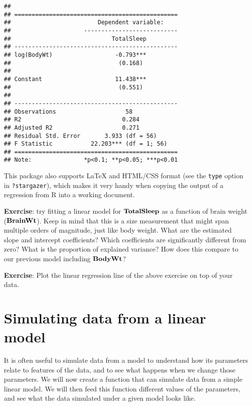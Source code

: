 \documentclass[
]{book}
\begin{document}
\begin{verbatim}
## 
## ===============================================
##                         Dependent variable:    
##                     ---------------------------
##                             TotalSleep         
## -----------------------------------------------
## log(BodyWt)                  -0.793***         
##                               (0.168)          
##                                                
## Constant                     11.438***         
##                               (0.551)          
##                                                
## -----------------------------------------------
## Observations                    58             
## R2                             0.284           
## Adjusted R2                    0.271           
## Residual Std. Error       3.933 (df = 56)      
## F Statistic           22.203*** (df = 1; 56)   
## ===============================================
## Note:               *p<0.1; **p<0.05; ***p<0.01
\end{verbatim}

This package also supports LaTeX and HTML/CSS format (see the \texttt{type} option in \texttt{?stargazer}), which makes it very handy when copying the output of a regression from R into a working document.

\textbf{Exercise}: try fitting a linear model for \(\bf{TotalSleep}\) as a function of brain weight (\(\bf{BrainWt}\)). Keep in mind that this is a size measurement that might span multiple orders of magnitude, just like body weight. What are the estimated slope and intercept coefficients? Which coefficients are significantly different from zero? What is the proportion of explained variance? How does this compare to our previous model including \(\bf{BodyWt}\)?

\textbf{Exercise}: Plot the linear regression line of the above exercise on top of your data.

\hypertarget{simulating-data-from-a-linear-model-1}{%
\section{Simulating data from a linear model}\label{simulating-data-from-a-linear-model-1}}

It is often useful to simulate data from a model to understand how its parameters relate to features of the data, and to see what happens when we change those parameters. We will now create a function that can simulate data from a simple linear model. We will then feed this function different values of the parameters, and see what the data simulated under a given model looks like.
\end{document}

